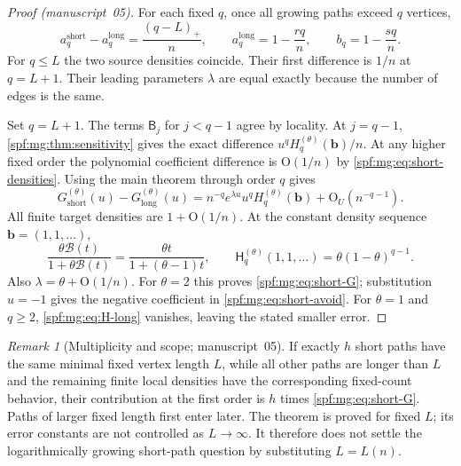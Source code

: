 \documentclass[11pt]{article}
\numberwithin{equation}{section}
\theoremstyle{definition}
\theoremstyle{remark}
\newtheorem{remark}[theorem]{Remark}
\theoremstyle{definition}
\newcommand{\bigO}{\mathrm O}
\newcommand{\mgb}{\boldsymbol b}
\begin{document}
\begin{proof}[Proof (manuscript~05)]
For each fixed $q$, once all growing paths exceed $q$ vertices,
\begin{equation}
 a_q^{\mathrm{short}}-a_q^{\mathrm{long}}
      =\frac{(q-L)_+}{n},
 \qquad
 a_q^{\mathrm{long}}=1-\frac{rq}{n},\qquad
 b_q=1-\frac{sq}{n}.
 \label{spf:mg:eq:short-densities}
\end{equation}
For $q\le L$ the two source densities coincide. Their first difference
is $1/n$ at $q=L+1$. Their leading parameters $\lambda$ are equal
exactly because the number of edges is the same.

Set $q=L+1$. The terms $\mathsf B_j$ for $j<q-1$ agree by locality. At $j=q-1$,
\cref{spf:mg:thm:sensitivity} gives the exact difference
$u^qH_q^{(\theta)}(\mgb)/n$. At any higher fixed order the polynomial
coefficient difference is $\bigO(1/n)$ by \eqref{spf:mg:eq:short-densities}.
Using the main theorem through order $q$ gives
\begin{equation}
 G_{\mathrm{short}}^{(\theta)}(u)-G_{\mathrm{long}}^{(\theta)}(u)
 =n^{-q}e^{\lambda u}u^qH_q^{(\theta)}(\mgb)
    +\bigO_U(n^{-q-1}).
 \label{spf:mg:eq:short-general}
\end{equation}
All finite target densities are $1+\bigO(1/n)$. At the constant density
sequence $\mgb=(1,1,\ldots)$,
\begin{equation}
 \frac{\theta\mathscr B(t)}{1+\theta\mathscr B(t)}
 =\frac{\theta t}{1+(\theta-1)t},\qquad
 \mathsf H_q^{(\theta)}(1,1,\ldots)
       =\theta(1-\theta)^{q-1}.
 \label{spf:mg:eq:H-long}
\end{equation}
Also $\lambda=\theta+\bigO(1/n)$. For $\theta=2$ this proves
\eqref{spf:mg:eq:short-G}; substitution $u=-1$ gives the negative coefficient
in \eqref{spf:mg:eq:short-avoid}. For $\theta=1$ and $q\ge2$,
\eqref{spf:mg:eq:H-long} vanishes, leaving the stated smaller error.
\end{proof}

\begin{remark}[Multiplicity and scope; manuscript~05]
If exactly $h$ short paths have the same minimal fixed vertex length
$L$, while all other paths are longer than $L$ and the remaining finite
local densities have the corresponding fixed-count behavior, their
contribution at the first order is $h$ times \eqref{spf:mg:eq:short-G}.
Paths of larger fixed length first enter later. The theorem is proved
for fixed $L$; its error constants are not controlled as $L\to\infty$.
It therefore does not settle the logarithmically growing short-path
question by substituting $L=L(n)$.
\end{remark}
\end{document}
